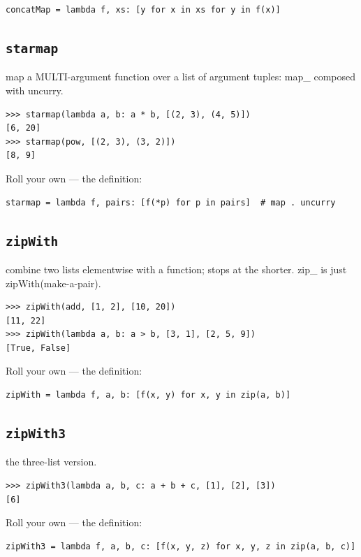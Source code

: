 \documentclass[10pt,letterpaper]{book}
\begin{document}
\begin{lstlisting}[style=ex]
concatMap = lambda f, xs: [y for x in xs for y in f(x)]
\end{lstlisting}
\subsection{\texttt{starmap}}\label{def:starmap}
map a MULTI-argument function over a list of argument tuples: map\_ composed with uncurry.
\begin{lstlisting}[style=ex]
>>> starmap(lambda a, b: a * b, [(2, 3), (4, 5)])
[6, 20]
>>> starmap(pow, [(2, 3), (3, 2)])
[8, 9]
\end{lstlisting}

Roll your own --- the definition:

\begin{lstlisting}[style=ex]
starmap = lambda f, pairs: [f(*p) for p in pairs]  # map . uncurry
\end{lstlisting}

\subsection{\texttt{zipWith}}\label{def:zipWith}
combine two lists elementwise with a function; stops at the shorter. zip\_ is just zipWith(make-a-pair).
\begin{lstlisting}[style=ex]
>>> zipWith(add, [1, 2], [10, 20])
[11, 22]
>>> zipWith(lambda a, b: a > b, [3, 1], [2, 5, 9])
[True, False]
\end{lstlisting}

Roll your own --- the definition:

\begin{lstlisting}[style=ex]
zipWith = lambda f, a, b: [f(x, y) for x, y in zip(a, b)]
\end{lstlisting}
\subsection{\texttt{zipWith3}}\label{def:zipWith3}
the three-list version.
\begin{lstlisting}[style=ex]
>>> zipWith3(lambda a, b, c: a + b + c, [1], [2], [3])
[6]
\end{lstlisting}

Roll your own --- the definition:

\begin{lstlisting}[style=ex]
zipWith3 = lambda f, a, b, c: [f(x, y, z) for x, y, z in zip(a, b, c)]
\end{lstlisting}
\end{document}
